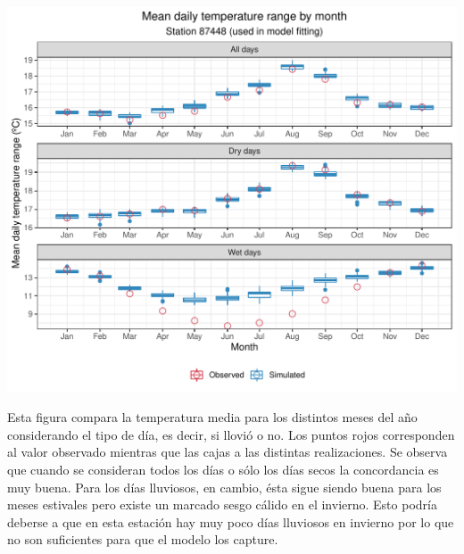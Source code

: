 \documentclass[
]{article}
\begin{document}
\begin{center}\includegraphics{Webinario_Generador_files/figure-latex/unnamed-chunk-57-1} \end{center}

Esta figura compara la temperatura media para los distintos meses del año considerando el tipo de día, es decir, si llovió o no. Los puntos rojos corresponden al valor observado mientras que las cajas a las distintas realizaciones. Se observa que cuando se consideran todos los días o sólo los días secos la concordancia es muy buena. Para los días lluviosos, en cambio, ésta sigue siendo buena para los meses estivales pero existe un marcado sesgo cálido en el invierno. Esto podría deberse a que en esta estación hay muy poco días lluviosos en invierno por lo que no son suficientes para que el modelo los capture.
\end{document}
